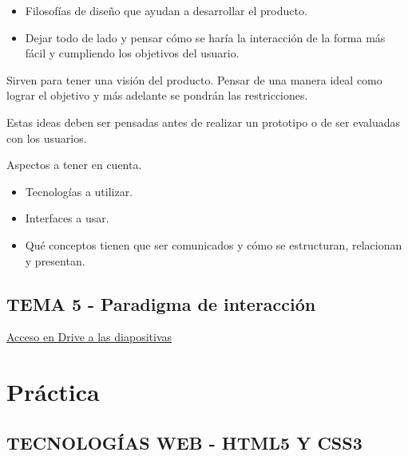 \documentclass[12pt, twoside, openright]{report} %
\begin{document}
\begin{itemize}
      \begin{itemize}
      
      \item
        Filosofías de diseño que ayudan a desarrollar el producto.
      \item
        Dejar todo de lado y pensar cómo se haría la interacción de la
        forma más fácil y cumpliendo los objetivos del usuario.
      \end{itemize}
    \end{itemize}

    Sirven para tener una visión del producto. Pensar de una manera
    ideal como lograr el objetivo y más adelante se pondrán las
    restricciones.

    Estas ideas deben ser pensadas antes de realizar un prototipo o de
    ser evaluadas con los usuarios.

    Aspectos a tener en cuenta.

    \begin{itemize}
    
    \item
      Tecnologías a utilizar.
    \item
      Interfaces a usar.
    \item
      Qué conceptos tienen que ser comunicados y cómo se estructuran,
      relacionan y presentan.
    \end{itemize}

\chapter{TEMA 5 - Paradigma de interacción}

  \href{https://drive.google.com/file/d/1cRk-uARzOR5F4dXptDtSAgrnZd1r5JDq}{Acceso en Drive a las diapositivas}

\part{Práctica}

\chapter{TECNOLOGÍAS WEB - HTML5 Y CSS3}
\end{document}

